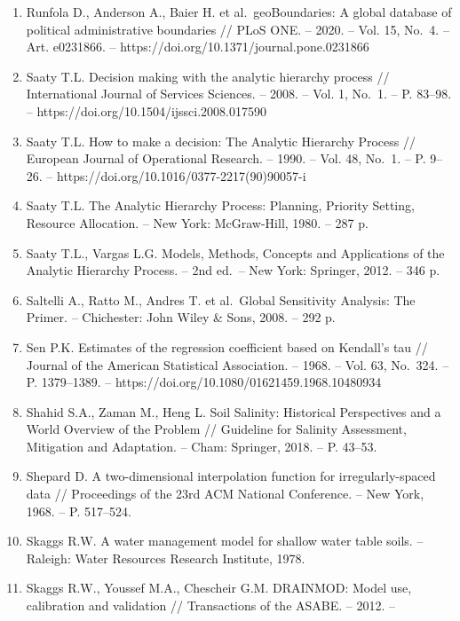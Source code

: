 \documentclass[14pt,a4paper,oneside]{extreport}
\begin{document}
\begin{enumerate}
  Rouse J.W., Haas R.H., Schell J.A., Deering D.W. Monitoring vegetation
  systems in the Great Plains with ERTS // Third ERTS Symposium, NASA
  SP-351. -- Washington, 1974. -- Vol. 1. -- P. 309--317.
\item
  Runfola D., Anderson A., Baier H. et al.~geoBoundaries: A global
  database of political administrative boundaries // PLoS ONE. -- 2020.
  -- Vol. 15, No.~4. -- Art. e0231866. --
  https://doi.org/10.1371/journal.pone.0231866
\item
  Saaty T.L. Decision making with the analytic hierarchy process //
  International Journal of Services Sciences. -- 2008. -- Vol. 1, No.~1.
  -- P. 83--98. -- https://doi.org/10.1504/ijssci.2008.017590
\item
  Saaty T.L. How to make a decision: The Analytic Hierarchy Process //
  European Journal of Operational Research. -- 1990. -- Vol. 48, No.~1.
  -- P. 9--26. -- https://doi.org/10.1016/0377-2217(90)90057-i
\item
  Saaty T.L. The Analytic Hierarchy Process: Planning, Priority Setting,
  Resource Allocation. -- New York: McGraw-Hill, 1980. -- 287 p.
\item
  Saaty T.L., Vargas L.G. Models, Methods, Concepts and Applications of
  the Analytic Hierarchy Process. -- 2nd ed.~-- New York: Springer,
  2012. -- 346 p.
\item
  Saltelli A., Ratto M., Andres T. et al.~Global Sensitivity Analysis:
  The Primer. -- Chichester: John Wiley \& Sons, 2008. -- 292 p.
\item
  Sen P.K. Estimates of the regression coefficient based on Kendall's
  tau // Journal of the American Statistical Association. -- 1968. --
  Vol. 63, No.~324. -- P. 1379--1389. --
  https://doi.org/10.1080/01621459.1968.10480934
\item
  Shahid S.A., Zaman M., Heng L. Soil Salinity: Historical Perspectives
  and a World Overview of the Problem // Guideline for Salinity
  Assessment, Mitigation and Adaptation. -- Cham: Springer, 2018. -- P.
  43--53.
\item
  Shepard D. A two-dimensional interpolation function for
  irregularly-spaced data // Proceedings of the 23rd ACM National
  Conference. -- New York, 1968. -- P. 517--524.
\item
  Skaggs R.W. A water management model for shallow water table soils. --
  Raleigh: Water Resources Research Institute, 1978.
\item
  Skaggs R.W., Youssef M.A., Chescheir G.M. DRAINMOD: Model use,
  calibration and validation // Transactions of the ASABE. -- 2012. --

\end{enumerate}
\end{document}
